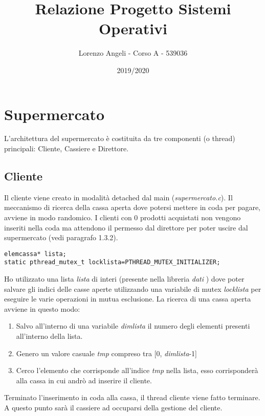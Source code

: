\documentclass{article} %
\title{Relazione Progetto Sistemi Operativi}
\author{Lorenzo Angeli - Corso A - 539036}
\date{2019/2020}
\begin{document}
\maketitle

\section{Supermercato}
L’architettura del supermercato è costituita da tre componenti (o thread) principali: Cliente, Cassiere e Direttore. 
\subsection{Cliente}
Il cliente viene creato in modalità detached dal main ({\itshape supermercato.c}). Il meccanismo di ricerca della cassa aperta dove potersi mettere in coda per pagare, avviene in modo randomico. I clienti con 0 prodotti acquistati non vengono inseriti nella coda ma attendono il permesso dal direttore per poter uscire dal supermercato (vedi paragrafo 1.3.2).
\begin{lstlisting}
elemcassa* lista;
static pthread_mutex_t locklista=PTHREAD_MUTEX_INITIALIZER; 
\end{lstlisting}
Ho utilizzato una lista {\itshape lista} di interi (presente nella libreria {\itshape dati} ) dove poter salvare gli indici delle casse aperte utilizzando una variabile di mutex {\itshape locklista} per eseguire le varie operazioni in mutua esclusione. La ricerca di una cassa aperta avviene in questo modo:
 \begin{enumerate} 
 \item Salvo all'interno di una variabile {\itshape dimlista} il numero degli elementi presenti all'interno della lista.
 \item Genero un valore casuale {\itshape tmp} compreso tra [0, {\itshape dimlista}-1]
 \item Cerco l'elemento che corrisponde all'indice {\itshape tmp} nella lista, esso corrisponderà alla cassa in cui andrò ad inserire il cliente.
 \end{enumerate}
Terminato l’inserimento in coda alla cassa, il thread cliente viene fatto terminare. A questo punto sarà il cassiere ad occuparsi della gestione del cliente. 
\end{document}
